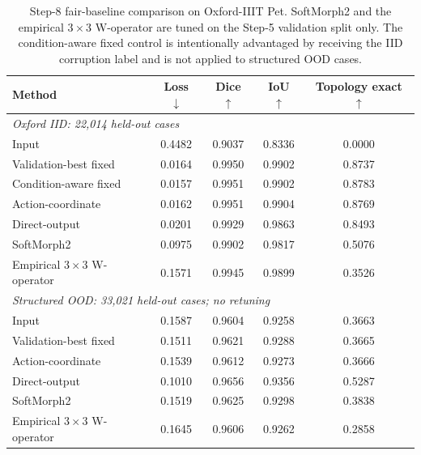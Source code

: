 \begin{table}[t]
\centering
\caption{Step-8 fair-baseline comparison on Oxford-IIIT Pet. SoftMorph2 and the empirical $3\times3$ W-operator are tuned on the Step-5 validation split only. The condition-aware fixed control is intentionally advantaged by receiving the IID corruption label and is not applied to structured OOD cases.}
\label{tab:step8baselines}
\scriptsize
\begin{tabular}{lcccc}
\toprule
Method & Loss $\downarrow$ & Dice $\uparrow$ & IoU $\uparrow$ & Topology exact $\uparrow$\\
\midrule
\multicolumn{5}{l}{\emph{Oxford IID: 22,014 held-out cases}}\\
Input & 0.4482 & 0.9037 & 0.8336 & 0.0000\\
Validation-best fixed & 0.0164 & 0.9950 & 0.9902 & 0.8737\\
Condition-aware fixed & 0.0157 & 0.9951 & 0.9902 & 0.8783\\
Action-coordinate & 0.0162 & 0.9951 & 0.9904 & 0.8769\\
Direct-output & 0.0201 & 0.9929 & 0.9863 & 0.8493\\
SoftMorph2 & 0.0975 & 0.9902 & 0.9817 & 0.5076\\
Empirical $3\times3$ W-operator & 0.1571 & 0.9945 & 0.9899 & 0.3526\\
\midrule
\multicolumn{5}{l}{\emph{Structured OOD: 33,021 held-out cases; no retuning}}\\
Input & 0.1587 & 0.9604 & 0.9258 & 0.3663\\
Validation-best fixed & 0.1511 & 0.9621 & 0.9288 & 0.3665\\
Action-coordinate & 0.1539 & 0.9612 & 0.9273 & 0.3666\\
Direct-output & 0.1010 & 0.9656 & 0.9356 & 0.5287\\
SoftMorph2 & 0.1519 & 0.9625 & 0.9298 & 0.3838\\
Empirical $3\times3$ W-operator & 0.1645 & 0.9606 & 0.9262 & 0.2858\\
\bottomrule
\end{tabular}
\end{table}
